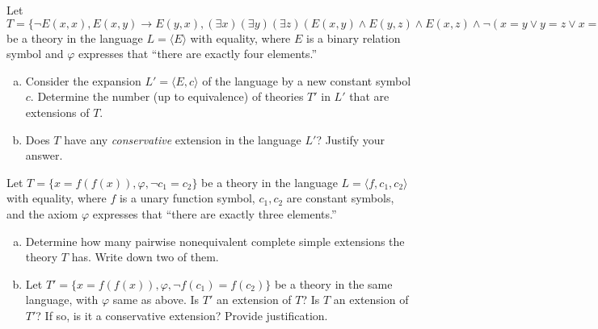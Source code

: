 \begin{problem}

    Let $T=\{\neg E(x,x), E(x,y)\to E(y,x), (\exists x)(\exists y)(\exists z)(E(x,y)\wedge E(y,z)\wedge E(x,z)\wedge \neg(x=y\vee y=z\vee x=z)),\varphi\}$ be a theory in the language $L=\langle E\rangle$ with equality, where $E$ is a binary relation symbol and $\varphi$ expresses that “there are exactly four elements.”
    \begin{enumerate}[(a)]
        \item Consider the expansion $L'=\langle E,c\rangle$ of the language by a new constant symbol $c$. Determine the number (up to equivalence) of theories $T'$ in $L'$ that are extensions of $T$. 
        \item Does $T$ have any \emph{conservative} extension in the language $L'$? Justify your answer.
    \end{enumerate}

\end{problem}


\begin{problem}

    Let $T=\{x=f(f(x)),\varphi, \neg c_1 = c_2\}$ be a theory in the language $L=\langle f,c_1,c_2\rangle$ with equality, where $f$ is a unary function symbol, $c_1,c_2$ are constant symbols, and the axiom $\varphi$ expresses that “there are exactly three elements.”
    \begin{enumerate}[(a)]    
        \item Determine how many pairwise nonequivalent complete simple extensions the theory $T$ has. Write down two of them.
        \item Let $T'=\{x=f(f(x)),\varphi,\neg f(c_1)=f(c_2)\}$ be a theory in the same language, with $\varphi$ same as above. Is $T'$ an extension of $T$? Is $T$ an extension of $T'$? If so, is it a conservative extension? Provide justification.
    \end{enumerate}
    
\end{problem}



